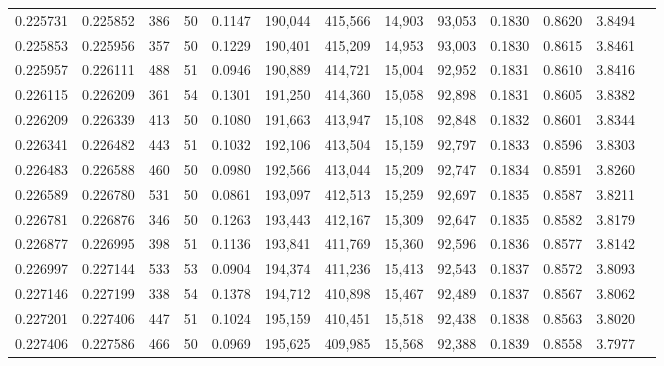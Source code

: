 \begin{tabular}{rrrrrrrrrrrrr}
0.225731 & 0.225852 &   386 &  50 &                                     0.1147 & 190,044 & 415,566 &  14,903 &  93,053 & 0.1830 & 0.8620 & 3.8494 \\
0.225853 & 0.225956 &   357 &  50 &                                     0.1229 & 190,401 & 415,209 &  14,953 &  93,003 & 0.1830 & 0.8615 & 3.8461 \\
0.225957 & 0.226111 &   488 &  51 &                                     0.0946 & 190,889 & 414,721 &  15,004 &  92,952 & 0.1831 & 0.8610 & 3.8416 \\
0.226115 & 0.226209 &   361 &  54 &                                     0.1301 & 191,250 & 414,360 &  15,058 &  92,898 & 0.1831 & 0.8605 & 3.8382 \\
0.226209 & 0.226339 &   413 &  50 &                                     0.1080 & 191,663 & 413,947 &  15,108 &  92,848 & 0.1832 & 0.8601 & 3.8344 \\
0.226341 & 0.226482 &   443 &  51 &                                     0.1032 & 192,106 & 413,504 &  15,159 &  92,797 & 0.1833 & 0.8596 & 3.8303 \\
0.226483 & 0.226588 &   460 &  50 &                                     0.0980 & 192,566 & 413,044 &  15,209 &  92,747 & 0.1834 & 0.8591 & 3.8260 \\
0.226589 & 0.226780 &   531 &  50 &                                     0.0861 & 193,097 & 412,513 &  15,259 &  92,697 & 0.1835 & 0.8587 & 3.8211 \\
0.226781 & 0.226876 &   346 &  50 &                                     0.1263 & 193,443 & 412,167 &  15,309 &  92,647 & 0.1835 & 0.8582 & 3.8179 \\
0.226877 & 0.226995 &   398 &  51 &                                     0.1136 & 193,841 & 411,769 &  15,360 &  92,596 & 0.1836 & 0.8577 & 3.8142 \\
0.226997 & 0.227144 &   533 &  53 &                                     0.0904 & 194,374 & 411,236 &  15,413 &  92,543 & 0.1837 & 0.8572 & 3.8093 \\
0.227146 & 0.227199 &   338 &  54 &                                     0.1378 & 194,712 & 410,898 &  15,467 &  92,489 & 0.1837 & 0.8567 & 3.8062 \\
0.227201 & 0.227406 &   447 &  51 &                                     0.1024 & 195,159 & 410,451 &  15,518 &  92,438 & 0.1838 & 0.8563 & 3.8020 \\
0.227406 & 0.227586 &   466 &  50 &                                     0.0969 & 195,625 & 409,985 &  15,568 &  92,388 & 0.1839 & 0.8558 & 3.7977 \\

\end{tabular}
